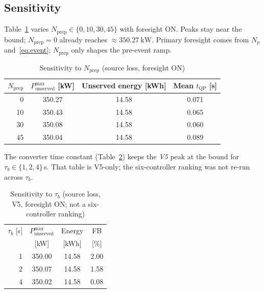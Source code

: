 \documentclass{ieeeaccess}
\begin{document}
\subsection{Sensitivity}
Table~\ref{tab:nprep} varies $N_{\mathrm{prep}}\in\{0,10,30,45\}$ with foresight ON. Peaks stay near the bound; $N_{\mathrm{prep}}=0$ already reaches $\approx\SI{350.27}{\kilo\watt}$. Primary foresight comes from $N_p$ and~\eqref{eq:event}; $N_{\mathrm{prep}}$ only shapes the pre-event ramp.

\begin{table}[!t]
\centering
\caption{Sensitivity to $N_{\mathrm{prep}}$ (source loss, foresight ON)}
\label{tab:nprep}
\begin{tabular}{@{}rccc@{}}
\toprule
$N_{\mathrm{prep}}$ & $P_{\mathrm{unserved}}^{\max}$ [kW] & Unserved energy [kWh] & Mean $t_{\mathrm{QP}}$ [s] \\
\midrule
0 & 350.27 & 14.58 & 0.071 \\
10 & 350.43 & 14.58 & 0.065 \\
30 & 350.08 & 14.58 & 0.060 \\
45 & 350.04 & 14.58 & 0.089 \\
\bottomrule
\end{tabular}
\end{table}

The converter time constant (Table~\ref{tab:tau}) keeps the \emph{V5} peak at the bound for $\tau_b\in\{1,2,4\}$\,s. That table is V5-only; the six-controller ranking was not re-run across $\tau_b$.

\begin{table}[!t]
\centering
\caption{Sensitivity to $\tau_b$ (source loss, V5, foresight ON; not a six-controller ranking)}
\label{tab:tau}
\begin{tabular}{@{}rccc@{}}
\toprule
$\tau_b$ [s] & $P_{\mathrm{unserved}}^{\max}$ & Energy & FB \\
 & [kW] & [kWh] & [\%] \\
\midrule
1 & 350.00 & 14.58 & 2.00 \\
2 & 350.07 & 14.58 & 1.58 \\
4 & 350.02 & 14.58 & 0.08 \\
\bottomrule
\end{tabular}
\end{table}
\end{document}
